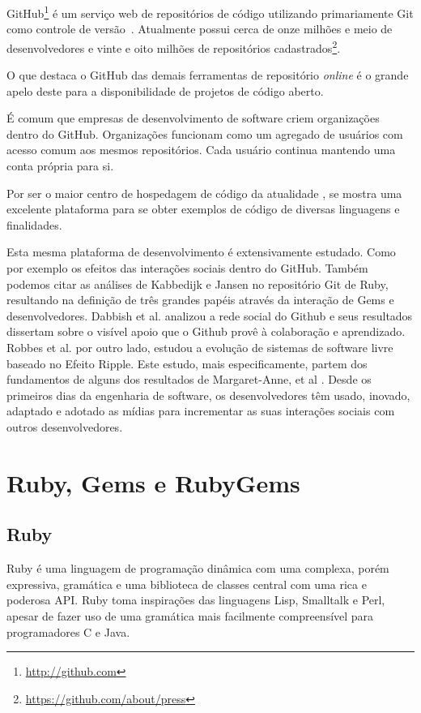 GitHub\footnote{\url{http://github.com}} é um serviço web de repositórios de código utilizando primariamente Git como controle de versão~\cite{Figueira2015}. Atualmente possui cerca de onze milhões e meio de desenvolvedores e vinte e oito milhões de repositórios cadastrados\footnote{\url{https://github.com/about/press}}.

O que destaca o GitHub das demais ferramentas de repositório \textit{online} é o grande apelo deste para a disponibilidade de projetos de código aberto.

É comum que empresas de desenvolvimento de software criem organizações dentro do GitHub. Organizações funcionam como um agregado de usuários com acesso comum aos mesmos repositórios. Cada usuário continua mantendo uma conta própria para si.

Por ser o maior centro de hospedagem de código da atualidade \cite{Gousios2012}, se mostra uma excelente plataforma para se obter exemplos de código de diversas linguagens e finalidades.

Esta mesma plataforma de desenvolvimento é extensivamente estudado. Como por exemplo os efeitos das interações sociais dentro do GitHub\cite{Syeed:2014:SCR:2641580.2641586}. Também podemos citar as análises de Kabbedijk e Jansen \cite{conf/icsob/KabbedijkJ11} no repositório Git de Ruby, resultando na definição de três grandes papéis através da interação de Gems e desenvolvedores. Dabbish et al. \cite{dabbish2012social} analizou a rede social do Github e seus resultados dissertam sobre o visível apoio que o Github provê à colaboração e aprendizado. Robbes et al. \cite{robbes2011study} por outro lado, estudou a evolução de sistemas de software livre baseado no Efeito Ripple. Este estudo, mais especificamente, partem dos fundamentos de alguns dos resultados de Margaret-Anne, et al \cite{Storey:2014:ESM:2593882.2593887}. Desde os primeiros dias da engenharia de software, os desenvolvedores têm usado, inovado, adaptado e adotado as mídias para incrementar as suas interações sociais com outros desenvolvedores.

\section{Ruby, Gems e RubyGems}

\subsection{Ruby}

Ruby é uma linguagem de programação dinâmica com uma complexa, porém expressiva, gramática e uma biblioteca de classes central com uma rica e poderosa API. Ruby toma inspirações das linguagens Lisp, Smalltalk e Perl, apesar de fazer uso de uma gramática mais facilmente compreensível para programadores C e Java.

